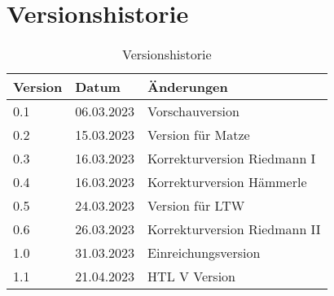 \section*{Versionshistorie}

\begin{table}[H]
  \centering
  \begin{tabular}{lll}
    \toprule
    \textbf{Version} & \textbf{Datum} & \textbf{Änderungen}          \\
    \midrule
    0.1              & 06.03.2023     & Vorschauversion              \\
    0.2              & 15.03.2023     & Version für Matze            \\
    0.3              & 16.03.2023     & Korrekturversion Riedmann I  \\
    0.4              & 16.03.2023     & Korrekturversion Hämmerle    \\
    0.5              & 24.03.2023     & Version für LTW              \\
    0.6              & 26.03.2023     & Korrekturversion Riedmann II \\
    1.0              & 31.03.2023     & Einreichungsversion          \\
    1.1              & 21.04.2023     & HTL V Version                \\
    \bottomrule
  \end{tabular}
  \caption{Versionshistorie}
  \label{tab:versionshistorie}
\end{table}